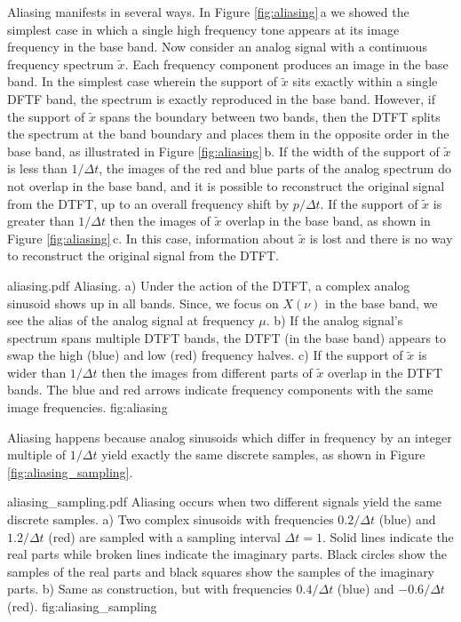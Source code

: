 \documentclass[twocolumn]{article}
\begin{document}
Aliasing manifests in several ways.
In Figure \ref{fig:aliasing}\,a we showed the simplest case in which a single high frequency tone appears at its image frequency in the base band.
Now consider an analog signal with a continuous frequency spectrum $\tilde{x}$.
Each frequency component produces an image in the base band.
In the simplest case wherein the support of $\tilde{x}$ sits exactly within a single DFTF band, the spectrum is exactly reproduced in the base band.
However, if the support of $\tilde{x}$ spans the boundary between two bands, then the DTFT splits the spectrum at the band boundary and places them in the opposite order in the base band, as illustrated in Figure \ref{fig:aliasing}\,b.
If the width of the support of $\tilde{x}$ is less than $1/\Delta t$, the images of the red and blue parts of the analog spectrum do not overlap in the base band, and it is possible to reconstruct the original signal from the DTFT, up to an overall frequency shift by $p/\Delta t$.
If the support of $\tilde{x}$ is greater than $1/\Delta t$ then the images of $\tilde{x}$ overlap in the base band, as shown in Figure \ref{fig:aliasing}\,c.
In this case, information about $\tilde{x}$ is lost and there is no way to reconstruct the original signal from the DTFT.

\quickfig{\columnwidth}
{aliasing.pdf}
{Aliasing. a) Under the action of the DTFT, a complex analog sinusoid shows up in all bands.
Since, we focus on $X(\nu)$ in the base band, we see the alias of the analog signal at frequency $\mu$.
b) If the analog signal's spectrum spans multiple DTFT bands, the DTFT (in the base band) appears to swap the high (blue) and low (red) frequency halves.
c) If the support of $\tilde{x}$ is wider than $1/\Delta t$ then the images from different parts of $\tilde{x}$ overlap in the DTFT bands.
The blue and red arrows indicate frequency components with the same image frequencies.}
{fig:aliasing}

Aliasing happens because analog sinusoids which differ in frequency by an integer multiple of $1/\Delta t$ yield exactly the same discrete samples, as shown in Figure \ref{fig:aliasing_sampling}.

\quickfig{\columnwidth}
{aliasing_sampling.pdf}
{Aliasing occurs when two different signals yield the same discrete samples.
a) Two complex sinusoids with frequencies $0.2/\Delta t$ (blue) and $1.2/\Delta t$ (red) are sampled with a sampling interval $\Delta t = 1$.
Solid lines indicate the real parts while broken lines indicate the imaginary parts.
Black circles show the samples of the real parts and black squares show the samples of the imaginary parts.
b) Same as construction, but with frequencies $0.4/\Delta t$ (blue) and $-0.6/\Delta t$ (red).
}
{fig:aliasing_sampling}
\end{document}
